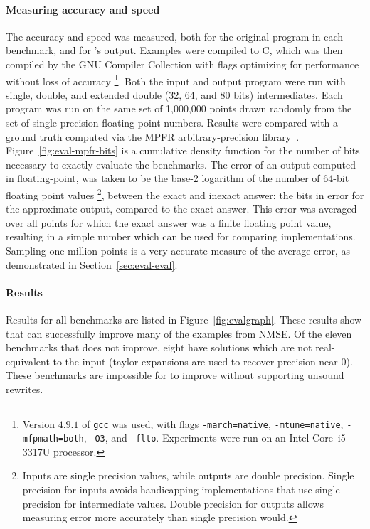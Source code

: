 \documentclass[paper.tex]{subfiles}
\begin{document}
\paragraph{Measuring accuracy and speed}
The accuracy and speed was measured,
  both for the original program in each benchmark,
  and for \casio's output.
Examples were compiled to C,
  which was then compiled by the GNU Compiler Collection
  with flags optimizing for performance without loss of accuracy%
  \footnote{Version $4.9.1$ of \texttt{gcc} was used, with flags
    \texttt{-march=native}, \texttt{-mtune=native},
    \texttt{-mfpmath=both}, \texttt{-O3}, and \texttt{-flto}.
    Experiments were run on an Intel Core~i5-3317U processor.}.
Both the input and output program were run
  with single, double, and extended double (32, 64, and 80 bits)
  intermediates.
Each program was run on the same set of 1,000,000 points
  drawn randomly from the set of single-precision floating point numbers.
Results were compared with a ground truth computed via
  the MPFR arbitrary-precision library~\cite{acm07-mpfr}.
Figure~\ref{fig:eval-mpfr-bits} is a cumulative density function
  for the number of bits necessary to exactly evaluate the benchmarks.
The error of an output computed in floating-point,
  was taken to be the base-2 logarithm of the number
  of 64-bit floating point values%
  \footnote{Inputs are single precision values,
    while outputs are double precision.
    Single precision for inputs avoids handicapping implementations
    that use single precision for intermediate values.
    Double precision for outputs allows measuring error
    more accurately than single precision would.},
  between the exact and inexact answer:
  the bits in error for the approximate output, compared to the exact answer.
This error was averaged over all points for which the exact answer
  was a finite floating point value,
  resulting in a simple number which can be used for comparing implementations.
Sampling one million points
  is a very accurate measure of the average error,
  as demonstrated in Section~\ref{sec:eval-eval}.

\paragraph{Results}
Results for all benchmarks are listed in Figure~\ref{fig:evalgraph}.
These results show that \casio can successfully improve many of the
examples from NMSE.  Of the eleven benchmarks that \casio does not
improve, eight have solutions which are not real-equivalent to the
input (taylor expansions are used to recover precision near 0).  These
benchmarks are impossible for \casio to improve without supporting
unsound rewrites.
\end{document}
